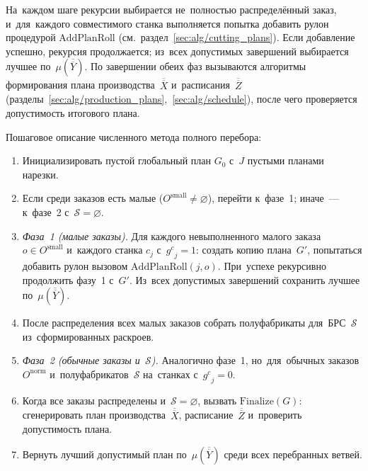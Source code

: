 На~каждом шаге рекурсии выбирается не~полностью распределённый заказ, и~для~каждого совместимого станка выполняется попытка добавить рулон процедурой $\mathrm{AddPlanRoll}$ (см.\ раздел~\ref{sec:alg/cutting_plans}).
Если добавление успешно, рекурсия продолжается; из~всех допустимых завершений выбирается лучшее по~$\mu(\overline{\overline{Y}})$.
По завершении обеих фаз вызываются алгоритмы формирования плана производства~$\overline{\overline{X}}$ и~расписания~$\overline{\overline{Z}}$ (разделы~\ref{sec:alg/production_plans},~\ref{sec:alg/schedule}), после чего проверяется допустимость итогового плана.


\begin{center}
    \resizebox{\textwidth}{!}
    {
      
    }
    \label{alg:full_enum}
\end{center}

\begin{center}
    \resizebox{\textwidth}{!}
    {
      
    }
\end{center}

\begin{center}
    \resizebox{\textwidth}{!}
    {
      
    }
\end{center}

Пошаговое описание численного метода полного перебора:
\begin{enumerate}
  \item Инициализировать пустой глобальный план $G_0$ с~$J$ пустыми планами нарезки.
  \item Если среди заказов есть малые ($O^{\mathrm{small}}\neq\varnothing$), перейти к~фазе~1; иначе~--- к~фазе~2 с~$\mathcal{S}=\varnothing$.
  \item \textit{Фаза~1 (малые заказы).} Для каждого невыполненного малого заказа $o\in O^{\mathrm{small}}$ и~каждого станка $c_j$ с~${g^c}_j=1$: создать копию плана~$G'$, попытаться добавить рулон вызовом $\mathrm{AddPlanRoll}(j,o)$.
  При~успехе рекурсивно продолжить фазу~1 с~$G'$.
  Из~всех допустимых завершений сохранить лучшее по~$\mu(\overline{\overline{Y}})$.
  \item После распределения всех малых заказов собрать полуфабрикаты для~БРС~$\mathcal{S}$ из~сформированных раскроев.
  \item \textit{Фаза~2 (обычные заказы и~$\mathcal{S}$).} Аналогично фазе~1, но~для~обычных заказов $O^{\mathrm{norm}}$ и~полуфабрикатов~$\mathcal{S}$ на~станках с~${g^c}_j=0$.
  \item Когда все заказы распределены и~$\mathcal{S}=\varnothing$, вызвать $\mathrm{Finalize}(G)$: сгенерировать план производства~$\overline{\overline{X}}$, расписание~$\overline{\overline{Z}}$ и~проверить допустимость плана.
  \item Вернуть лучший допустимый план по~$\mu(\overline{\overline{Y}})$ среди всех перебранных ветвей.
\end{enumerate}

